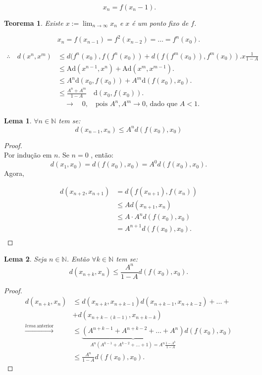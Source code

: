 \documentclass{article}
\newtheorem*{theorem}{Teorema}
\newtheorem*{lemma}{Lema}
\begin{document}
\[
\ x_n = f(x_n -1).
\]

\begin{theorem}
    Existe $x := \lim_{n \to \infty} x_n$ e $x$ é um ponto fixo de $f$.
\end{theorem}
    
\[
x_n = f(x_{n-1}) = f^2(x_{n-2}) = \ldots = f^n(x_0).
\]

\begin{align*}
    \therefore\quad d(x^n, x^m) &\leq d(f^n(x_0), f(f^n(x_0)) + d(f(f^m(x_0)), f^m(x_0)).{x\frac{1}{1-A}} \\
    &\leq \mathrm{Ad}(x^{n-1}, x^n) + \mathrm{Ad}(x^m, x^{m-1}). \\
    &\leq A^n \mathrm{d}(x_0, f(x_0)) + A^m \mathrm{d}(f(x_0), x_0). \\
    &\leq \frac{A^n + A^m}{1 - A} \quad \mathrm{d}(x_0, f(x_0)). \\
    &\quad \rightarrow \quad 0, \quad \text{pois } A^n, A^m \rightarrow 0 \text{, dado que } A < 1.
\end{align*}

\pagebreak

\begin{lemma}
$\forall n \in \mathbb{N}$ tem se:
\[
d(x_{n-1},x_n)\leq A^n d(f(x_0),x_0)
\]
\end{lemma} 

\begin{proof}\mbox{}\\
Por indução em $n$. Se $n=0$ , então:
\[
d(x_1,x_0)=d(f(x_0),x_0)=A^0 d(f(x_0),x_0).
\]
Agora, 

\begin{align*}
d(x_{n+2},x_{n+1}) &= d(f(x_{n+1}),f(x_n)) \\
&\leq A d(x_{n+1},x_n) \\
&\leq A \cdot A^nd(f(x_0),x_0)  \\
&= A^{n+1}d(f(x_0),x_0). \\
\end{align*}
\end{proof}

\begin{lemma}
Seja $n \in \mathbb{N}$. Então $\forall k \in \mathbb{N}$ tem se: 
\[
d(x_{n+k},x_n) \leq \frac{A^n}{1-A}d(f(x_0),x_0).
\]
\end{lemma}

\begin{proof}
\begin{align*}
d(x_{n+k},x_n)&\leq d(x_{n+k},x_{n+k-1})d(x_{n+k-1},x_{n+k-2})+...+\\
&+d(x_{n+k-(k-1)},x_{n+k-k})\\
\xrightarrow{lema\ \text{anterior}}&\leq \underbrace{(A^{n+k-1}+A^{n+k-2}+\ldots+A^n)}_{\text{$A^n(A^{k-1}+A^{k-2}+\ldots+1) = A^n\frac{1-A^k}{1-A}$}}d(f(x_0),x_0)\\
&\leq\frac{A^n}{1-A}d(f(x_0),x_0).
\end{align*}
\end{proof} 
\end{document}
